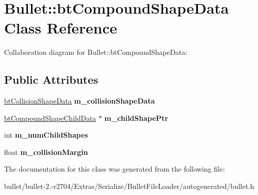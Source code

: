 \hypertarget{class_bullet_1_1bt_compound_shape_data}{\section{Bullet\+:\+:bt\+Compound\+Shape\+Data Class Reference}
\label{class_bullet_1_1bt_compound_shape_data}
}


Collaboration diagram for Bullet\+:\+:bt\+Compound\+Shape\+Data\+:
\subsection*{Public Attributes}
\begin{DoxyCompactItemize}
\item 
\hypertarget{class_bullet_1_1bt_compound_shape_data_a3143fa01258dbe2f186f1376530b6e04}{\hyperlink{class_bullet_1_1bt_collision_shape_data}{bt\+Collision\+Shape\+Data} {\bfseries m\+\_\+collision\+Shape\+Data}}\label{class_bullet_1_1bt_compound_shape_data_a3143fa01258dbe2f186f1376530b6e04}

\item 
\hypertarget{class_bullet_1_1bt_compound_shape_data_a45d96ae9599d4d2fba8656b38e0d5155}{\hyperlink{class_bullet_1_1bt_compound_shape_child_data}{bt\+Compound\+Shape\+Child\+Data} $\ast$ {\bfseries m\+\_\+child\+Shape\+Ptr}}\label{class_bullet_1_1bt_compound_shape_data_a45d96ae9599d4d2fba8656b38e0d5155}

\item 
\hypertarget{class_bullet_1_1bt_compound_shape_data_a6eb7be306a337051b08f5e78c107afd9}{int {\bfseries m\+\_\+num\+Child\+Shapes}}\label{class_bullet_1_1bt_compound_shape_data_a6eb7be306a337051b08f5e78c107afd9}

\item 
\hypertarget{class_bullet_1_1bt_compound_shape_data_a46cbbb139e9c687eefa6d9bfeeeaec66}{float {\bfseries m\+\_\+collision\+Margin}}\label{class_bullet_1_1bt_compound_shape_data_a46cbbb139e9c687eefa6d9bfeeeaec66}

\end{DoxyCompactItemize}


The documentation for this class was generated from the following file\+:\begin{DoxyCompactItemize}
\item 
bullet/bullet-\/2.-\/r2704/\+Extras/\+Serialize/\+Bullet\+File\+Loader/autogenerated/bullet.\+h\end{DoxyCompactItemize}
